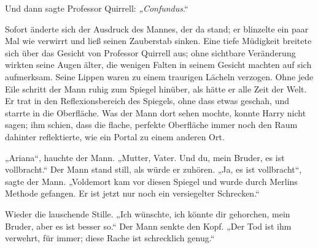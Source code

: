 Und dann sagte Professor Quirrell: \emph{„Confundus}.“

Sofort änderte sich der Ausdruck des Mannes, der da stand; er blinzelte ein paar Mal wie verwirrt und ließ seinen Zauberstab sinken.
Eine tiefe Müdigkeit breitete sich über das Gesicht von Professor Quirrell aus; ohne sichtbare Veränderung wirkten seine Augen älter, die wenigen Falten in seinem Gesicht machten auf sich aufmerksam. Seine Lippen waren zu einem traurigen Lächeln verzogen. Ohne jede Eile schritt der Mann ruhig zum Spiegel hinüber, als hätte er alle Zeit der Welt. Er trat in den Reflexionsbereich des Spiegels, ohne dass etwas geschah, und starrte in die Oberfläche. Was der Mann dort sehen mochte, konnte Harry nicht sagen; ihm schien, dass die flache, perfekte Oberfläche immer noch den Raum dahinter reflektierte, wie ein Portal zu einem anderen Ort.

„Ariana“, hauchte der Mann. „Mutter, Vater. Und du, mein Bruder, es ist vollbracht.“
Der Mann stand still, als würde er zuhören. „Ja, es ist vollbracht“, sagte der Mann. „Voldemort kam vor diesen Spiegel und wurde durch Merlins Methode gefangen. Er ist jetzt nur noch ein versiegelter Schrecken.“

Wieder die lauschende Stille.
„Ich wünschte, ich könnte dir gehorchen, mein Bruder, aber es ist besser so.“
Der Mann senkte den Kopf.
„Der Tod ist ihm verwehrt, für immer; diese Rache ist schrecklich genug.“


